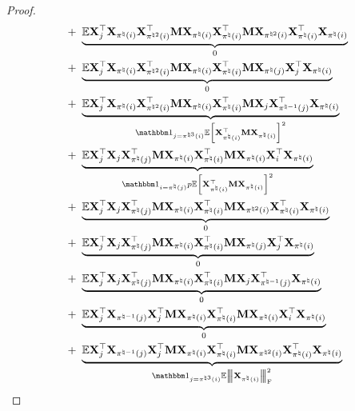 \documentclass[11pt]{article}
\begin{document}
\begin{proof}
\begin{align}
+~& \underbrace{\Expc \bX_j^{\rmt}
\bX_{\pi^{\natural}(i)}\bX_{\pi^{\natural 2}(i)}^{\rmt}
\bM
\bX_{\pi^{\natural}(i)} \bX_{\pi^{\natural}(i)}^{\rmt}
\bM
\bX_{\pi^{\natural 2}(i)}\bX_{\pi^{\natural}(i)}^{\rmt}
\bX_{\pi^{\natural}(i)}}_{0} \notag \\
+~& \underbrace{\Expc \bX_j^{\rmt}
\bX_{\pi^{\natural}(i)}\bX_{\pi^{\natural 2}(i)}^{\rmt}
\bM
\bX_{\pi^{\natural}(i)} \bX_{\pi^{\natural}(i)}^{\rmt}
\bM
\bX_{\pi^{\natural}(j)}\bX_{j}^{\rmt}
\bX_{\pi^{\natural}(i)}}_{0}\notag \\
+~&
\underbrace{\Expc \bX_j^{\rmt}
\bX_{\pi^{\natural}(i)}\bX_{\pi^{\natural 2}(i)}^{\rmt}
\bM
\bX_{\pi^{\natural}(i)} \bX_{\pi^{\natural}(i)}^{\rmt}
\bM
\bX_{j}\bX_{\pi^{\natural -1}(j)}^{\rmt}
\bX_{\pi^{\natural}(i)}}_{
\Ind_{j = \pi^{\natural 3}(i)}
\Expc \Bracket{\bX_{\pi^{\natural}(i)}^{\rmt}\bM \bX_{\pi^{\natural}(i)} }^2
}\notag \\
+~&
\underbrace{\Expc \bX_j^{\rmt}
\bX_{j}\bX_{\pi^{\natural}(j)}^{\rmt}
\bM
\bX_{\pi^{\natural}(i)} \bX_{\pi^{\natural}(i)}^{\rmt}
\bM
\bX_{\pi^{\natural}(i)}\bX_{i}^{\rmt}
\bX_{\pi^{\natural}(i)}}_{
\Ind_{i = \pi^{\natural}(j)}p
\Expc \Bracket{\bX_{\pi^{\natural}(i)}^{\rmt}\bM \bX_{\pi^{\natural}(i)} }^2
} \notag \\
+~& \underbrace{\Expc \bX_j^{\rmt}
\bX_{j}\bX_{\pi^{\natural}(j)}^{\rmt}
\bM
\bX_{\pi^{\natural}(i)} \bX_{\pi^{\natural}(i)}^{\rmt}
\bM
\bX_{\pi^{\natural 2}(i)}\bX_{\pi^{\natural}(i)}^{\rmt}
\bX_{\pi^{\natural}(i)}}_{0} \notag \\
+~& \underbrace{\Expc \bX_j^{\rmt}
\bX_{j}\bX_{\pi^{\natural}(j)}^{\rmt}
\bM
\bX_{\pi^{\natural}(i)} \bX_{\pi^{\natural}(i)}^{\rmt}
\bM
\bX_{\pi^{\natural}(j)}\bX_{j}^{\rmt}
\bX_{\pi^{\natural}(i)}}_{0} \notag \\
+~& \underbrace{\Expc \bX_j^{\rmt}
\bX_{j}\bX_{\pi^{\natural}(j)}^{\rmt}
\bM
\bX_{\pi^{\natural}(i)} \bX_{\pi^{\natural}(i)}^{\rmt}
\bM
\bX_{j}\bX_{\pi^{\natural -1}(j)}^{\rmt}
\bX_{\pi^{\natural}(i)}}_{0} \notag \\
+~& \underbrace{\Expc \bX_j^{\rmt}
\bX_{\pi^{\natural -1}(j)}\bX_{j}^{\rmt}
\bM
\bX_{\pi^{\natural}(i)} \bX_{\pi^{\natural}(i)}^{\rmt}
\bM
\bX_{\pi^{\natural}(i)}\bX_{i}^{\rmt}
\bX_{\pi^{\natural}(i)}}_{0} \notag \\
+~& \underbrace{\Expc \bX_j^{\rmt}
\bX_{\pi^{\natural -1}(j)}\bX_{j}^{\rmt}
\bM
\bX_{\pi^{\natural}(i)} \bX_{\pi^{\natural}(i)}^{\rmt}
\bM
\bX_{\pi^{\natural 2}(i)}\bX_{\pi^{\natural}(i)}^{\rmt}
\bX_{\pi^{\natural}(i)}}_{
\Ind_{j = \pi^{\natural 3}(i)}
\Expc \Fnorm{\bX_{\pi^{\natural}(i)}}^2
}
\end{align}
\end{proof}
\end{document}
